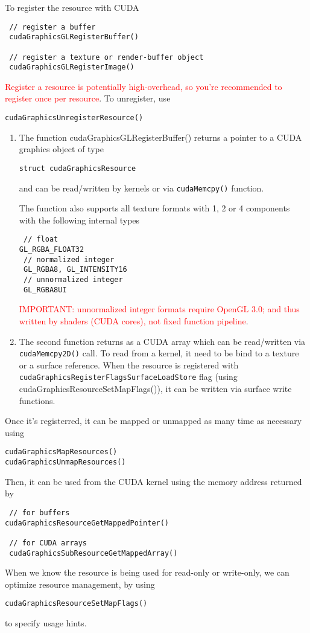 To register the resource with CUDA
\begin{verbatim}
 // register a buffer
 cudaGraphicsGLRegisterBuffer()
 
 // register a texture or render-buffer object
 cudaGraphicsGLRegisterImage()
\end{verbatim}
\textcolor{red}{Register a resource is potentially high-overhead, so you're
recommended to register once per resource}. To unregister, use 
\begin{verbatim}
cudaGraphicsUnregisterResource()
\end{verbatim}
\begin{enumerate}
  \item The function cudaGraphicsGLRegisterBuffer() returns a pointer to a CUDA graphics
object of type
\begin{verbatim}
struct cudaGraphicsResource
\end{verbatim}
and can be read/written by kernels or via \verb!cudaMemcpy()! function.

The function also supports all texture formats with 1, 2 or 4 components with
the following internal types
\begin{verbatim}
 // float
GL_RGBA_FLOAT32
 // normalized integer
 GL_RGBA8, GL_INTENSITY16
 // unnormalized integer
 GL_RGBA8UI
\end{verbatim}

\textcolor{red}{IMPORTANT: unnormalized integer formats require OpenGL 3.0; and
thus written by shaders (CUDA cores), not fixed function pipeline}. 


 \item The second function returns as a CUDA array which can be read/written
 via \verb!cudaMemcpy2D()! call. To read from a kernel, it need to be bind to
 a texture or a surface reference. When the resource is registered with
 \verb!cudaGraphicsRegisterFlagsSurfaceLoadStore! flag (using 
 cudaGraphicsResourceSetMapFlags()), it can be written via surface write 
 functions.
\end{enumerate}


Once it's registerred, it can be mapped or unmapped as many time as necessary
using 
\begin{verbatim}
cudaGraphicsMapResources()
cudaGraphicsUnmapResources()
\end{verbatim}
Then, it can be used from the CUDA kernel using the memory address returned by
\begin{verbatim}
 // for buffers
cudaGraphicsResourceGetMappedPointer()

 // for CUDA arrays
 cudaGraphicsSubResourceGetMappedArray() 
\end{verbatim}
When we know the resource is being used for read-only or write-only, we can 
optimize resource management, by using  
\begin{verbatim}
cudaGraphicsResourceSetMapFlags() 
\end{verbatim}
to specify usage hints. 

